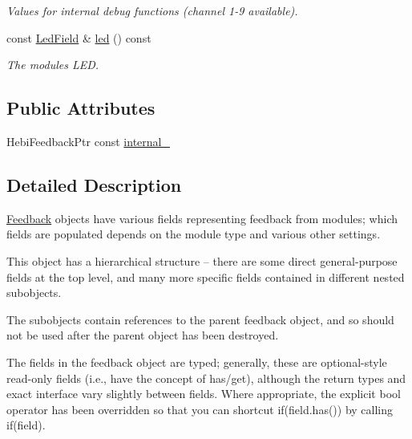 \begin{DoxyCompactItemize}
\begin{DoxyCompactList}\small\item\em Values for internal debug functions (channel 1-\/9 available). \end{DoxyCompactList}\item 
const \hyperlink{classhebi_1_1Feedback_1_1LedField}{Led\+Field} \& \hyperlink{classhebi_1_1Feedback_a96a52d85fc278e41e3957ff9c741241b}{led} () const \hypertarget{classhebi_1_1Feedback_a96a52d85fc278e41e3957ff9c741241b}{}\label{classhebi_1_1Feedback_a96a52d85fc278e41e3957ff9c741241b}

\begin{DoxyCompactList}\small\item\em The module\textquotesingle{}s L\+ED. \end{DoxyCompactList}\end{DoxyCompactItemize}
\subsection*{Public Attributes}
\begin{DoxyCompactItemize}
\item 
Hebi\+Feedback\+Ptr const \hyperlink{classhebi_1_1Feedback_ae91da5bbb8a77c135981df418d7515b1}{internal\+\_\+}
\end{DoxyCompactItemize}


\subsection{Detailed Description}
\hyperlink{classhebi_1_1Feedback}{Feedback} objects have various fields representing feedback from modules; which fields are populated depends on the module type and various other settings. 

This object has a hierarchical structure -- there are some direct general-\/purpose fields at the top level, and many more specific fields contained in different nested subobjects.

The subobjects contain references to the parent feedback object, and so should not be used after the parent object has been destroyed.

The fields in the feedback object are typed; generally, these are optional-\/style read-\/only fields (i.\+e., have the concept of has/get), although the return types and exact interface vary slightly between fields. Where appropriate, the explicit bool operator has been overridden so that you can shortcut {\ttfamily if}(field.\+has()) by calling {\ttfamily if(field)}.

